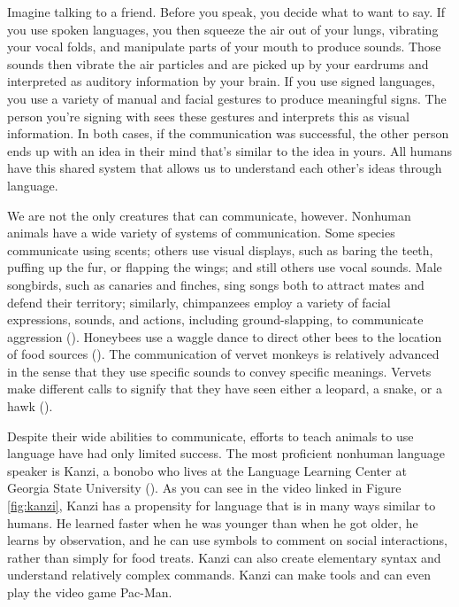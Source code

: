 \documentclass[
]{krantz}
\begin{document}
Imagine talking to a friend. Before you speak, you decide what to want to say. If you use spoken languages, you then squeeze the air out of your lungs, vibrating your vocal folds, and manipulate parts of your mouth to produce sounds. Those sounds then vibrate the air particles and are picked up by your eardrums and interpreted as auditory information by your brain. If you use signed languages, you use a variety of manual and facial gestures to produce meaningful signs. The person you're signing with sees these gestures and interprets this as visual information. In both cases, if the communication was successful, the other person ends up with an idea in their mind that's similar to the idea in yours. All humans have this shared system that allows us to understand each other's ideas through language.

We are not the only creatures that can communicate, however. Nonhuman animals have a wide variety of systems of communication. Some species communicate using scents; others use visual displays, such as baring the teeth, puffing up the fur, or flapping the wings; and still others use vocal sounds. Male songbirds, such as canaries and finches, sing songs both to attract mates and defend their territory; similarly, chimpanzees employ a variety of facial expressions, sounds, and actions, including ground-slapping, to communicate aggression (). Honeybees use a waggle dance to direct other bees to the location of food sources (). The communication of vervet monkeys is relatively advanced in the sense that they use specific sounds to convey specific meanings. Vervets make different calls to signify that they have seen either a leopard, a snake, or a hawk ().

Despite their wide abilities to communicate, efforts to teach animals to use language have had only limited success. The most proficient nonhuman language speaker is Kanzi, a bonobo who lives at the Language Learning Center at Georgia State University (). As you can see in the video linked in Figure \ref{fig:kanzi}, Kanzi has a propensity for language that is in many ways similar to humans. He learned faster when he was younger than when he got older, he learns by observation, and he can use symbols to comment on social interactions, rather than simply for food treats. Kanzi can also create elementary syntax and understand relatively complex commands. Kanzi can make tools and can even play the video game Pac-Man.
\end{document}
